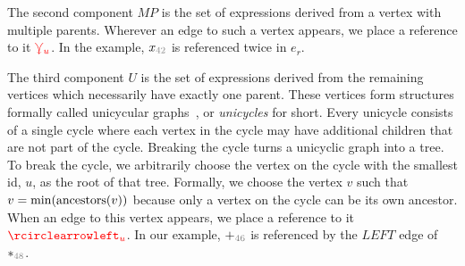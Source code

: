 
The second component $MP$ is the set of expressions derived from a vertex with multiple parents.
Wherever an edge to such a vertex appears, we place a reference to it $\textcolor{red}{\curlyveedownarrow_{u}}$.
In the example, $x_{\id{42}}$ is referenced twice in $e_r$.

The third component $U$ is the set of expressions derived from the remaining vertices which necessarily have exactly one parent.
These vertices form structures formally called unicycular graphs~\citep{DBLP:journals/algorithmica/KruskalRS90}, or \emph{unicycles} for short.
Every unicycle consists of a single cycle where each vertex in the cycle may have additional children that are not part of the cycle.
Breaking the cycle turns a unicyclic graph into a tree.
To break the cycle, we arbitrarily choose the vertex on the cycle with the smallest id, $u$, as the root of that tree.
Formally, we choose the vertex $v$ such that $v = \min(\operatorname{\text{ancestors}}(v))$ because
only a vertex on the cycle can be its own ancestor.
When an edge to this vertex appears, we place a reference to it $\cycleVertex{u}$.
In our example, ${+}_{\id{46}}$ is referenced by the $LEFT$ edge of ${*}_{\id{48}}$.




